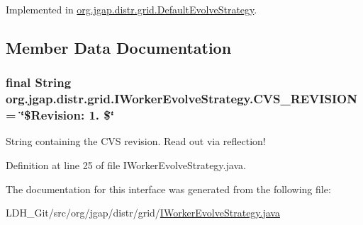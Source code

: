 Implemented in \hyperlink{classorg_1_1jgap_1_1distr_1_1grid_1_1_default_evolve_strategy_a1e190f538909bffb004ead71df515b92}{org.\-jgap.\-distr.\-grid.\-Default\-Evolve\-Strategy}.



\subsection{Member Data Documentation}
\hypertarget{interfaceorg_1_1jgap_1_1distr_1_1grid_1_1_i_worker_evolve_strategy_a205865be2134b54e3bfe58d0a06bf538}{
\subsubsection[{C\-V\-S\-\_\-\-R\-E\-V\-I\-S\-I\-O\-N}]{\setlength{\rightskip}{0pt plus 5cm}final String org.\-jgap.\-distr.\-grid.\-I\-Worker\-Evolve\-Strategy.\-C\-V\-S\-\_\-\-R\-E\-V\-I\-S\-I\-O\-N = \char`\"{}\$Revision\-: 1. \$\char`\"{}\hspace{0.3cm}{\ttfamily [static]}}}\label{interfaceorg_1_1jgap_1_1distr_1_1grid_1_1_i_worker_evolve_strategy_a205865be2134b54e3bfe58d0a06bf538}
String containing the C\-V\-S revision. Read out via reflection! 

Definition at line 25 of file I\-Worker\-Evolve\-Strategy.\-java.



The documentation for this interface was generated from the following file\-:\begin{DoxyCompactItemize}
\item 
L\-D\-H\-\_\-\-Git/src/org/jgap/distr/grid/\hyperlink{_i_worker_evolve_strategy_8java}{I\-Worker\-Evolve\-Strategy.\-java}\end{DoxyCompactItemize}
